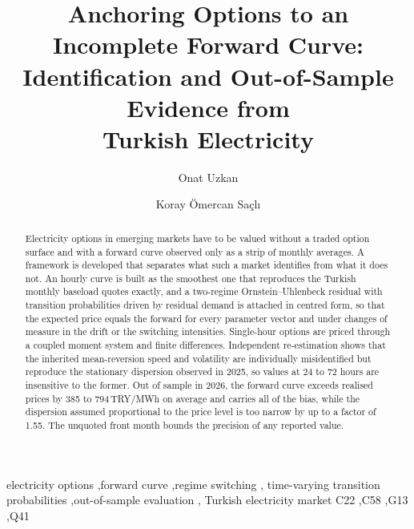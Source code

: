 \documentclass[preprint,12pt,authoryear]{elsarticle}
\begin{document}
\begin{frontmatter}

\title{Anchoring Options to an Incomplete Forward Curve:\\
Identification and Out-of-Sample Evidence from\\
Turkish Electricity}

\author[ozu]{Onat Uzkan}
\author[itu]{Koray Ömercan Saçlı}

\address[ozu]{Department of Mechanical Engineering, Özyeğin University,
Istanbul, Türkiye}
\address[itu]{Department of Mechanical Engineering, Istanbul Technical
University, Istanbul, Türkiye}

\begin{abstract}
Electricity options in emerging markets have to be valued without a traded
option surface and with a forward curve observed only as a strip of monthly
averages. A framework is developed that separates what such a market
identifies from what it does not. An hourly curve is built as the smoothest
one that reproduces the Turkish monthly baseload quotes exactly, and a
two-regime Ornstein--Uhlenbeck residual with transition probabilities driven
by residual demand is attached in centred form, so that the expected price
equals the forward for every parameter vector and under changes of measure in
the drift or the switching intensities. Single-hour options are priced through a
coupled moment system and finite differences. Independent
re-estimation shows that the inherited mean-reversion speed and volatility are
individually misidentified but reproduce the stationary dispersion observed in
2025, so values at 24 to 72 hours are insensitive to the former. Out of sample
in 2026, the forward curve exceeds realised prices by 385 to
794\,TRY/MWh on average and carries all of the bias, while the dispersion
assumed proportional to the price level is too narrow by up to a factor of
1.55. The unquoted front month bounds the precision of any reported value.
\end{abstract}

\begin{keyword}
electricity options \sep forward curve \sep regime switching \sep
time-varying transition probabilities \sep out-of-sample evaluation \sep
Turkish electricity market
\JEL C22 \sep C58 \sep G13 \sep Q41
\end{keyword}

\end{frontmatter}
\end{document}
